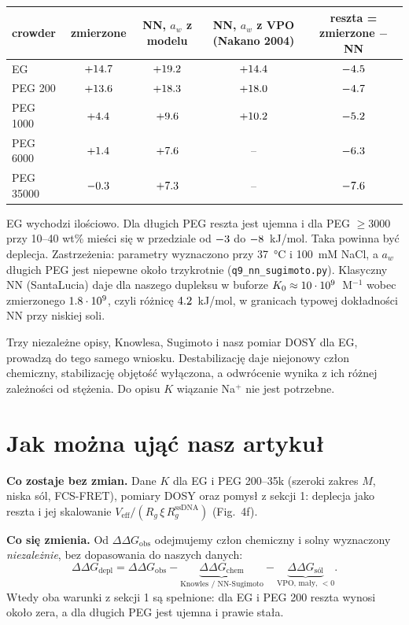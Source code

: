 \documentclass[11pt,a4paper]{article}
\newcommand{\dG}{\Delta\Delta G}
\begin{document}
\begin{center}\small
\begin{tabular}{lcccc}
\toprule
crowder & zmierzone & NN, $a_w$ z modelu & NN, $a_w$ z VPO (Nakano 2004) & reszta = zmierzone $-$ NN\\
\midrule
EG & $+14.7$ & $+19.2$ & $+14.4$ & $-4.5$\\
PEG 200 & $+13.6$ & $+18.3$ & $+18.0$ & $-4.7$\\
PEG 1000 & $+4.4$ & $+9.6$ & $+10.2$ & $-5.2$\\
PEG 6000 & $+1.4$ & $+7.6$ & -- & $-6.3$\\
PEG 35000 & $-0.3$ & $+7.3$ & -- & $-7.6$\\
\bottomrule
\end{tabular}
\end{center}
EG wychodzi ilościowo. Dla długich PEG reszta jest ujemna i dla PEG $\geq$3000 przy 10--40 wt\% mieści się w przedziale od $-3$ do $-8$~kJ/mol. Taka powinna być deplecja. Zastrzeżenia: parametry wyznaczono przy 37~°C i 100~mM NaCl, a $a_w$ długich PEG jest niepewne około trzykrotnie (\texttt{q9\_nn\_sugimoto.py}). Klasyczny NN (SantaLucia) daje dla naszego dupleksu w buforze $K_0\approx10\cdot10^9$~M$^{-1}$ wobec zmierzonego $1.8\cdot10^9$, czyli różnicę $4.2$~kJ/mol, w granicach typowej dokładności NN przy niskiej soli.

\begin{wniosek}
Trzy niezależne opisy, Knowlesa, Sugimoto i nasz pomiar DOSY dla EG, prowadzą do tego samego wniosku. Destabilizację daje niejonowy człon chemiczny, stabilizację objętość wyłączona, a odwrócenie wynika z ich różnej zależności od stężenia. Do opisu $K$ wiązanie Na$^+$ nie jest potrzebne.
\end{wniosek}

\section{Jak można ująć nasz artykuł}

\textbf{Co zostaje bez zmian.} Dane $K$ dla EG i PEG 200--35k (szeroki zakres $M$, niska sól, FCS-FRET), pomiary DOSY oraz pomysł z sekcji 1: deplecja jako reszta i jej skalowanie $V_\text{eff}/(R_g\,\xi\,R_g^\text{ssDNA})$ (Fig.~4f).

\textbf{Co się zmienia.} Od $\dG_\text{obs}$ odejmujemy człon chemiczny i solny wyznaczony \emph{niezależnie}, bez dopasowania do naszych danych:
\[
\dG_\text{depl}=\dG_\text{obs}-\underbrace{\dG_\text{chem}}_{\text{Knowles / NN-Sugimoto}}-\underbrace{\dG_\text{sól}}_{\text{VPO, mały, }<0}.
\]
Wtedy oba warunki z sekcji 1 są spełnione: dla EG i PEG 200 reszta wynosi około zera, a dla długich PEG jest ujemna i prawie stała.
\end{document}
